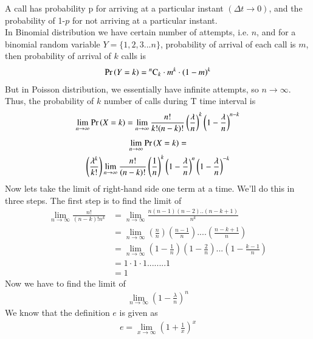 \documentclass[journal,12pt,twocolumn]{IEEEtran}
\begin{document}
A call has probability p for arriving at a particular instant $(\Delta t\rightarrow 0)$, and the probability of 1-$p$ for not arriving at a particular instant.\\

In Binomial distribution we have certain number of attempts, i.e. $n$, and for a binomial random variable $Y=\{1,2,3...n\}$, probability of arrival of each call is $m$, then probability of arrival of $k$ calls is 
\begin{align}
    \Pr\left(Y=k\right)={}^{n}\mathrm{C}_{k}\cdot m^k\cdot(1-m)^k
\end{align} But in Poisson distribution, we essentially have infinite attempts, so $n\rightarrow\infty$. Thus, the probability of $k$ number of calls during T time interval is
\begin{align}
   \lim_{n \to \infty}\Pr\left(X=k\right)=\lim_{n \to \infty}\frac{n!}{k!(n-k)!}\left(\frac{\lambda}{n}\right)^k\left(1-\frac{\lambda}{n}\right)^{n-k}
\end{align}
\begin{multline}  \label{5}
    \lim_{n \to \infty}\Pr\left(X=k\right)=\\
    \left(\frac{\lambda^k}{k!}\right)\lim_{n \to \infty}\frac{n!}{(n-k)!}\left(\frac{1}{n}\right)^k\left(1-\frac{\lambda}{n}\right)^n\left(1-\frac{\lambda}{n}\right)^{-k}
\end{multline}
Now lets take the limit of right-hand side one term at a time. We’ll do this in three steps. The first step is to find the limit of 
\begin{equation}
\begin{split}\label{6}
     \lim_{n \to \infty}\frac{n!}{(n-k)!n^k}
     &= \lim_{n \to \infty}\frac{n(n-1)(n-2)..(n-k+1)}{n^k}\\
    & = \lim_{n \to\infty}\left(\frac{n}{n}\right)\left(\frac{n-1}{n}\right)....\left(\frac{n-k+1}{n}\right)\\
   &= \lim_{n \to \infty}\left(1-\frac{1}{n}\right)\left(1-\frac{2}{n}\right)...\left(1-\frac{k-1}{n}\right)\\
    &=1\cdot1\cdot1........1\\
    &=1   
    \end{split}
\end{equation}
Now we have to find the limit of 
\begin{align}\label{7}
    \lim_{n \to \infty}\left(1-\frac{\lambda}{n}\right)^n 
\end{align}
We know that the definition $e$ is given as 
\begin{align}
    e=\lim_{x \to \infty}\left(1+\frac{1}{x}\right)^x
\end{align}
\end{document}
